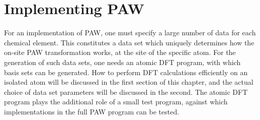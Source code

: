 \documentclass[a4paper]{article}
\begin{document}
\section{Implementing PAW}\label{sec: implementing}
For an implementation of PAW, one must specify a large number of data
for each chemical element. This constitutes a data set which uniquely
determines how the on-site PAW transformation works, at the site of
the specific atom. For the generation of such data sets, one needs an
atomic DFT program, with which basis sets can be generated. How to
perform DFT calculations efficiently on an isolated atom will be
discussed in the first section of this chapter, and the actual choice
of data set parameters will be discussed in the second. The atomic DFT
program plays the additional role of a small test program, against
which implementations in the full PAW program can be tested.
\end{document}

